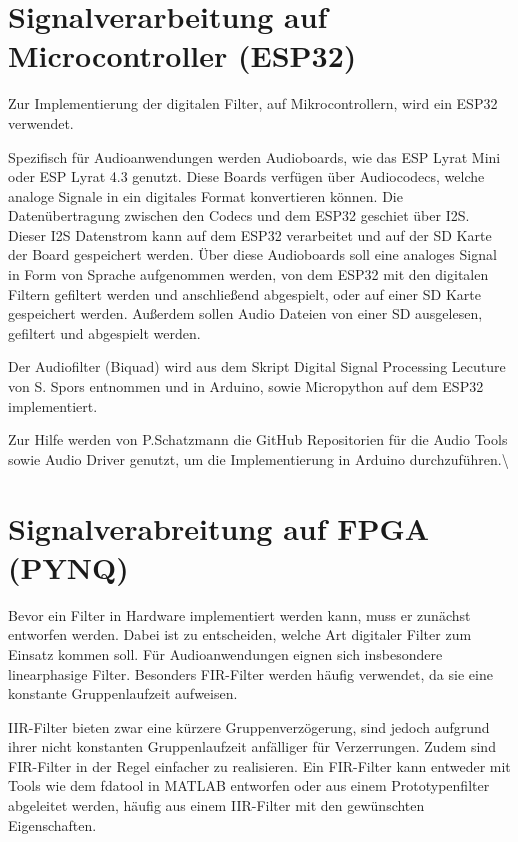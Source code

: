 \documentclass[
  ngerman,
  letterpaper,
  DIV=11]{scrartcl}
\begin{document}
\section{Signalverarbeitung auf Microcontroller
(ESP32)}\label{signalverarbeitung-auf-microcontroller-esp32}

Zur Implementierung der digitalen Filter, auf Mikrocontrollern, wird ein
ESP32 verwendet.

Spezifisch für Audioanwendungen werden Audioboards, wie das ESP Lyrat
Mini oder ESP Lyrat 4.3 genutzt. Diese Boards verfügen über Audiocodecs,
welche analoge Signale in ein digitales Format konvertieren können. Die
Datenübertragung zwischen den Codecs und dem ESP32 geschiet über I2S.
Dieser I2S Datenstrom kann auf dem ESP32 verarbeitet und auf der SD
Karte der Board gespeichert werden. Über diese Audioboards soll eine
analoges Signal in Form von Sprache aufgenommen werden, von dem ESP32
mit den digitalen Filtern gefiltert werden und anschließend abgespielt,
oder auf einer SD Karte gespeichert werden. Außerdem sollen Audio
Dateien von einer SD ausgelesen, gefiltert und abgespielt werden.

Der Audiofilter (Biquad) wird aus dem Skript Digital Signal Processing
Lecuture von S. Spors entnommen und in Arduino, sowie Micropython auf
dem ESP32 implementiert.

Zur Hilfe werden von P.Schatzmann die GitHub Repositorien für die Audio
Tools sowie Audio Driver genutzt, um die Implementierung in Arduino
durchzuführen.\textbackslash{}

\section{Signalverabreitung auf FPGA
(PYNQ)}\label{signalverabreitung-auf-fpga-pynq}

Bevor ein Filter in Hardware implementiert werden kann, muss er zunächst
entworfen werden. Dabei ist zu entscheiden, welche Art digitaler Filter
zum Einsatz kommen soll. Für Audioanwendungen eignen sich insbesondere
linearphasige Filter. Besonders FIR-Filter werden häufig verwendet, da
sie eine konstante Gruppenlaufzeit aufweisen.

IIR-Filter bieten zwar eine kürzere Gruppenverzögerung, sind jedoch
aufgrund ihrer nicht konstanten Gruppenlaufzeit anfälliger für
Verzerrungen. Zudem sind FIR-Filter in der Regel einfacher zu
realisieren. Ein FIR-Filter kann entweder mit Tools wie dem fdatool in
MATLAB entworfen oder aus einem Prototypenfilter abgeleitet werden,
häufig aus einem IIR-Filter mit den gewünschten Eigenschaften.
\end{document}
